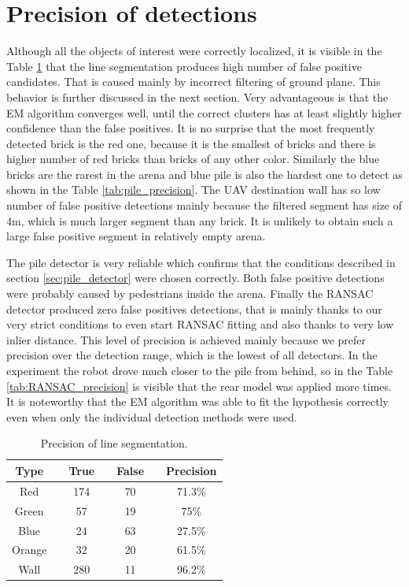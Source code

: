 \section{Precision of detections}
Although all the objects of interest were correctly localized, it is visible in the Table \ref{tab:seg_precision} that the line segmentation produces high number of false positive candidates. That is caused mainly by incorrect filtering of ground plane. This behavior is further discussed in the next section. Very advantageous is that the EM algorithm converges well, until the correct clusters has at least slightly higher confidence than the false positives. It is no surprise that the most frequently detected brick is the red one, because it is the smallest of bricks and there is higher number of red bricks than bricks of any other color. Similarly the blue bricks are the rarest in the arena and blue pile is also the hardest one to detect as shown in the Table \ref{tab:pile_precision}. The UAV destination wall has so low number of false positive detections mainly because the filtered segment has size of $4$m, which is much larger segment than any brick. It is unlikely to obtain such a large false positive segment in relatively empty arena.

The pile detector is very reliable which confirms that the conditions described in section \ref{sec:pile_detector} were chosen correctly. Both false positive detections were probably caused by pedestrians inside the arena. Finally the RANSAC detector produced zero false positives detections, that is mainly thanks to our very strict conditions to even start RANSAC fitting and also thanks to very low inlier distance. This level of precision is achieved mainly because we prefer precision over the detection range, which is the lowest of all detectors. In the experiment the robot drove much closer to the pile from behind, so in the Table \ref{tab:RANSAC_precision} is visible that the rear model was applied more times. It is noteworthy that the EM algorithm was able to fit the hypothesis correctly even when only the individual detection methods were used.

\begin{table}[H]
	\centering
	\begin{tabular}{ccccccc}
		\toprule
		Type &\quad& True &\quad& False &\quad& Precision \\
		\midrule
		Red &\quad& 174 &\quad& 70 &\quad&71.3\% \\
		Green &\quad& 57 &\quad& 19 &\quad& 75\% \\
		Blue &\quad& 24 &\quad& 63 &\quad& 27.5\% \\
		Orange &\quad& 32 &\quad& 20 &\quad& 61.5\% \\
		Wall &\quad& 280 &\quad& 11 &\quad& 96.2\% \\
		\bottomrule
	\end{tabular}
	\caption{Precision of line segmentation.}
	\label{tab:seg_precision}
\end{table}


